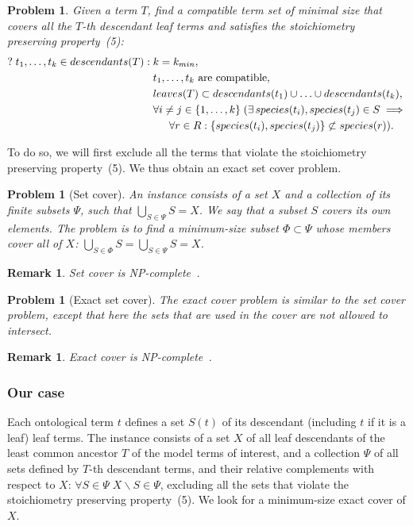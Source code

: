 \documentclass[10pt]{bmc_article}
\newenvironment{bmcformat}{\baselineskip20pt\sloppy\setboolean{publ}{false}}{\baselineskip20pt\sloppy}
\begin{document}
\begin{bmcformat}
\newtheorem{pp}[pbm]{Problem}
\begin{pp}
Given a term $T$, find a compatible term set of minimal size that covers all the $T$-th descendant leaf terms and satisfies the stoichiometry preserving property~(5):
\begin{align}
\nonumber ?\; t_1, \ldots, t_k \in descendants(T):\; & k = k_{min},\\
&t_1, \ldots, t_k \text{ are compatible},\\
&leaves(T) \subset descendants(t_1) \cup \ldots \cup descendants(t_k) ,\\
&\forall i \neq j \in \{1, \ldots, k\}\; (\exists\, species(t_i), species(t_j) \in S \implies \\
\nonumber &\indent \forall r \in R: \{species(t_i), species(t_j)\} \not \subset species(r)).
\end{align}
\end{pp}
To do so, we will first exclude all the terms that violate the stoichiometry preserving property~(5). We thus obtain an exact set cover problem. 

\newtheorem{setc}[pbm]{Problem}
\begin{setc}[Set cover]
An instance consists of a set $X$ and a collection of its finite subsets $\Psi$, such that $\bigcup_{S \in \Psi} S = X$. We say that a subset $S$ covers its own elements. The problem is to find a minimum-size subset $\Phi \subset \Psi$ whose members cover all of $X$: $\bigcup_{S \in \Phi} S = \bigcup_{S \in \Psi} S = X$.
\end{setc}
\newtheorem{rem}[rm]{Remark}
\begin{rem}
 Set cover is \textit{NP}-complete~\cite{Cormen2001}.
\end{rem}

\newtheorem{esetc}[pbm]{Problem}
\begin{esetc}[Exact set cover]
The exact cover problem is similar to the set cover problem, except that here the sets that are used in the cover are not allowed to intersect. 
\end{esetc}
\newtheorem{rem1}[rm]{Remark}
\begin{rem1}
Exact cover is \textit{NP}-complete~\cite{Goldreich2008}.
\end{rem1}

\subsubsection*{Our case}
Each ontological term $t$ defines a set $S(t)$ of its descendant (including $t$ if it is a leaf) leaf terms. The instance consists of a set $X$ of all leaf descendants of the least common ancestor $T$ of the model terms of interest, and a collection $\Psi$ of all sets defined by $T$-th descendant terms, and their relative complements with respect to $X$: $\forall S \in \Psi \; X\backslash S \in \Psi$, excluding all the sets that violate the stoichiometry preserving property~(5). We look for a minimum-size exact cover of $X$. 


\end{bmcformat}
\end{document}
